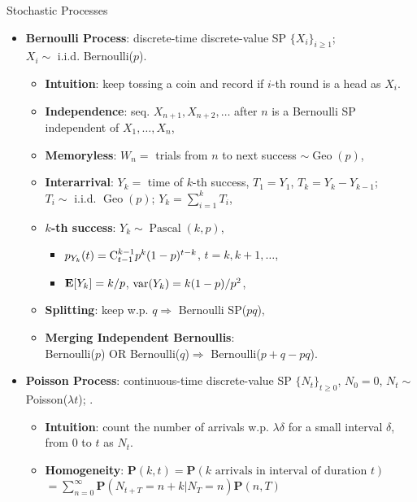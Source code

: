 \documentclass[landscape,a4paper]{article}
\begin{document}
\begin{cheatsheetcolumns}
\begin{card}{Stochastic Processes}
\begin{itemize}
\begin{itemize}
					$\left\{Z_{t_1}, Z_{t_2}, \dots\right\}$, $t_1, t_2\in T$ is a sequence of time-relavent RVs defined on prob. space $\left(\Omega, \mathcal F, \mathbf P\right)$.
					\item Once the sample path $\omega$ is fixed, values of the whole RV walk $\left\{Z_{t_1}(\omega), Z_{t_2}(\omega), \dots\right\}$ are fixed.
				\end{itemize}
				\item \textbf{Bernoulli Process}: discrete-time discrete-value SP $\{X_i\}_{i\ge1}$;\\$X_i\sim$ i.i.d. Bernoulli($p$).
				\begin{itemize}
					\item \textbf{Intuition}: keep tossing a coin and record if $i$-th round is a head as $X_i$.
					\item \textbf{Independence}: seq. $X_{n+1}, X_{n+2}, \dots$ after $n$ is a Bernoulli SP independent of $X_1,\dots,X_n$,
					\item \textbf{Memoryless}: $W_n=$ trials from $n$ to next success $\sim\operatorname{Geo}(p)$,
					\item \textbf{Interarrival}: $Y_k=$ time of $k$-th success, $T_1=Y_1$, $T_k=Y_k-Y_{k-1}$;\\ $T_i\sim$ i.i.d. $\operatorname{Geo}(p)$; $Y_k=\sum_{i=1}^kT_i$,
					\item \textbf{$k$-th success}: $Y_k\sim\operatorname{Pascal}(k,p)$,
					\begin{itemize}
						\item $p_{Y_k}(t)=\mathrm{C}_{t-1}^{k-1}p^k(1-p)^{t-k}$, $t=k,k+1,\dots$,
						\item $\mathbf{E}[Y_k]=k/p$, $\operatorname{var}(Y_k)=k(1-p)/p^2$,
					\end{itemize}
					\item \textbf{Splitting}: keep w.p. $q\Rightarrow$ Bernoulli SP($pq$),
					\item \textbf{Merging Independent Bernoullis}:\\ Bernoulli($p$) OR Bernoulli($q$)$\Rightarrow$ Bernoulli($p+q-pq$).
				\end{itemize}
				\item \textbf{Poisson Process}: continuous-time discrete-value SP $\{N_t\}_{t\ge0}$, $N_0=0$, $N_t\sim$ Poisson($\lambda t$); .
				\begin{itemize}
					\item \textbf{Intuition}: count the number of arrivals w.p. $\lambda\delta$ for a small interval $\delta$, from $0$ to $t$ as $N_t$. 
					\item \textbf{Homogeneity}: $\mathbf P(k,t)=\mathbf P(\text{$k$ arrivals in interval of duration $t$})$\\$=\sum_{n=0}^\infty \mathbf P(N_{t+T}=n+k|N_T=n)\mathbf P(n,T)$

\end{itemize}
\end{itemize}
\end{card}
\end{cheatsheetcolumns}
\end{document}
